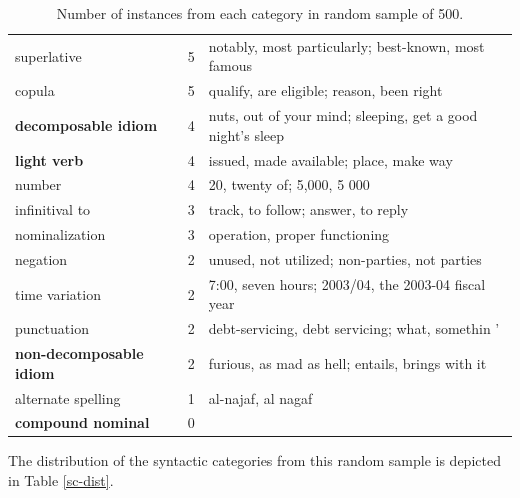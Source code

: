 \documentclass[11pt]{article}
\begin{document}
\begin{itemize}
\begin{center}
\begin{table}
\begin{tabular}{|l|l|l|}
superlative & 5 & notably, most particularly; best-known, most famous\\
copula & 5 & qualify, are eligible; reason, been right \\
\bf decomposable idiom & 4 & nuts, out of your mind; sleeping, get a good night's sleep\\
\bf light verb & 4  &  issued, made available; place, make way \\
number & 4 & 20, twenty of; 5,000, 5 000\\
infinitival to & 3 & track, to follow; answer, to reply \\
nominalization & 3 &  operation, proper functioning \\
negation & 2 & unused, not utilized; non-parties, not parties  \\
time variation & 2 & 7:00, seven hours; 2003/04, the 2003-04 fiscal year\\
punctuation & 2 & debt-servicing, debt servicing; what, somethin '\\
\bf non-decomposable idiom & 2 & furious, as mad as hell; entails, brings with it\\
alternate spelling & 1 & al-najaf, al nagaf\\
\bf compound nominal & 0 &\\
\hline
\end{tabular}
\hfill{}
\caption{\label{font-table} Number of instances from each category in random sample of 500. }
\end{table}
\end{center}
The distribution of the syntactic categories from this random sample is depicted in Table \ref{sc-dist}. 


\end{itemize}
\end{document}
